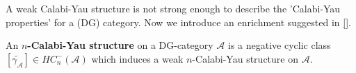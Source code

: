 A weak Calabi-Yau structure is not strong enough to describe the 'Calabi-Yau properties' for a (DG) category. Now we introduce an enrichment suggested in \ref{}.
\begin{mydefn}
	An \textbf{$n$-Calabi-Yau structure} on a DG-category $\mathcal{A}$ is a negative cyclic class $[\tilde{\gamma_{\mathcal{A}}}] \in HC_n^{-}(\mathcal{A})$ which induces a weak $n$-Calabi-Yau structure on $\mathcal{A}$.
\end{mydefn}  